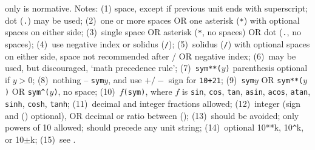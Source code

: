 \documentclass[11pt,a4paper]{ivoa}
\newcommand{\unit}[1]{\texttt{\small\color{orange}#1}}
\begin{document}
\begin{table}[th]
{    only  is normative.
  \label{tabx:comparUnitCombine}
  Notes: (1) space, except if previous unit ends with superscript; dot (\unit{.}) may be used;
  (2)~one or more spaces OR one asterisk (\unit{*}) with optional spaces on either side;
  (3)~single space OR asterisk (\unit{*}, no spaces) OR dot (\unit{.}, no spaces);
  (4)~use negative index or solidus (\unit{/});
  (5)~solidus (\unit{/}) with optional spaces on either side, space not recommended after / OR negative index;
  (6)~may be used, but discouraged, `math precedence rule';
  (7)~\unit{sym**($y$)} parenthesis optional if $y>0$;
  (8)~nothing -- \unit{sym$y$}, and use $+/-$ sign for \unit{10+21};
  (9)~\unit{sym$y$} OR \unit{sym**($y$)} OR \unit{sym\^{}($y$)}, no space;
  (10)~\unit{$f$(sym)}, where $f$ is
\unit{sin}, \unit{cos}, \unit{tan}, \unit{asin}, \unit{acos}, \unit{atan}, \unit{sinh}, \unit{cosh}, \unit{tanh};
  (11)~decimal and integer fractions allowed;
  (12)~integer (sign and () optional), OR decimal or ratio between ();
  (13)~should be avoided; only powers of 10 allowed; should precede any unit string;
  (14)~optional 10**k, 10\texttt{\^}k, or 10$\pm$k;
  (15)~see .}
\end{table}
\end{document}
